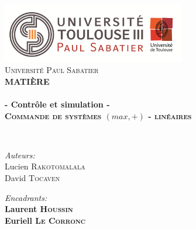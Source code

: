 
\begin{titlepage}
\begin{center}


\includegraphics[width=0.60\textwidth]{./page_de_garde/logo_ups.png}~\\[1cm]

\textsc{\LARGE Université Paul Sabatier}\\[1.5cm]

\textsc{\Large \bf MATIÈRE }\\[0.5cm]

\HRule \\[0.4cm]

{\huge \bfseries  - Contrôle et simulation -\\
\vspace{3mm}
\textsc{ Commande de systèmes $(max,+)$ - linéaires}}

\HRule \\[1.5cm]

\begin{minipage}{0.4\textwidth}
\begin{flushleft} \large
\emph{Auteurs:}\\
Lucien \textsc{Rakotomalala}\\
David \textsc{Tocaven}\\
\end{flushleft}
\end{minipage}
\begin{minipage}{0.58\textwidth}
\begin{flushright} \large
\emph{Encadrants:} \\
\textbf{ Laurent \textsc{Houssin}}\\
\textbf{ Euriell \textsc{Le Corronc}}
\end{flushright}
\end{minipage}
\newline
\newline


\end{center}
\end{titlepage}
